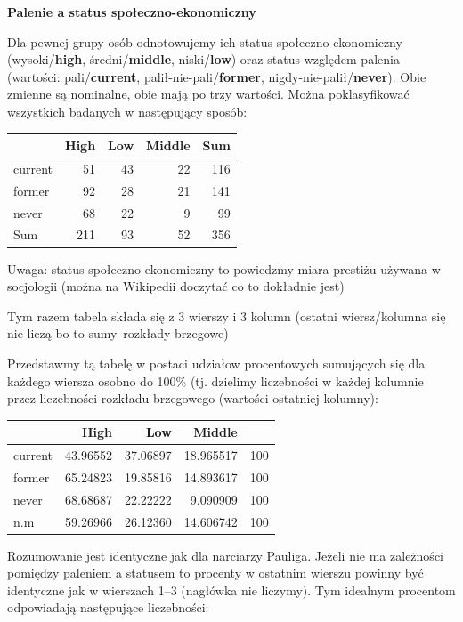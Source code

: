 \documentclass[
  openany]{book}
\begin{document}
\begin{example}
\textbf{Palenie a status społeczno-ekonomiczny}

Dla pewnej grupy osób odnotowujemy ich status-społeczno-ekonomiczny
(wysoki/\textbf{high}, średni/\textbf{middle}, niski/\textbf{low})
oraz status-względem-palenia
(wartości: pali/\textbf{current}, palił-nie-pali/\textbf{former}, nigdy-nie-palił/\textbf{never}).
Obie zmienne są nominalne, obie mają po trzy wartości. Można
poklasyfikować wszystkich badanych w następujący sposób:

\begin{tabular}{l|r|r|r|r}
\hline
  & High & Low & Middle & Sum\\
\hline
current & 51 & 43 & 22 & 116\\
\hline
former & 92 & 28 & 21 & 141\\
\hline
never & 68 & 22 & 9 & 99\\
\hline
Sum & 211 & 93 & 52 & 356\\
\hline
\end{tabular}

Uwaga: status-społeczno-ekonomiczny to powiedzmy miara prestiżu używana w socjologii
(można na Wikipedii doczytać co to dokładnie jest)

Tym razem tabela składa się z 3 wierszy i 3 kolumn (ostatni wiersz/kolumna się
nie liczą bo to sumy--rozkłady brzegowe)

Przedstawmy tą tabelę w postaci udziałow procentowych sumujących się
dla każdego wiersza osobno do 100\% (tj. dzielimy
liczebności w każdej kolumnie przez liczebności rozkładu brzegowego (wartości
ostatniej kolumny):

\begin{tabular}{l|r|r|r|r}
\hline
  & High & Low & Middle & \\
\hline
current & 43.96552 & 37.06897 & 18.965517 & 100\\
\hline
former & 65.24823 & 19.85816 & 14.893617 & 100\\
\hline
never & 68.68687 & 22.22222 & 9.090909 & 100\\
\hline
n.m & 59.26966 & 26.12360 & 14.606742 & 100\\
\hline
\end{tabular}

Rozumowanie jest identyczne jak dla narciarzy Pauliga. Jeżeli nie ma zależności
pomiędzy paleniem a statusem to procenty w ostatnim wierszu powinny
być identyczne jak w wierszach 1--3 (nagłówka nie liczymy). Tym idealnym
procentom odpowiadają następujące liczebności:


\end{example}
\end{document}
